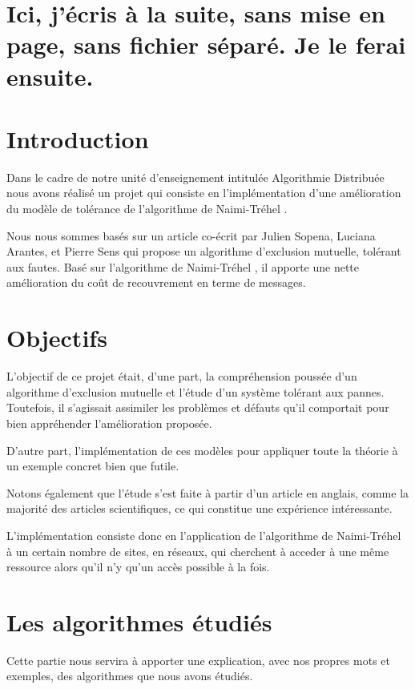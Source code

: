 \documentclass[a4paper,12pt]{article}
\title{\psubject}
\author{Raimana BOUISSOU, Tom GIMENEZ, Léo RIZZON}
\date{}
\newcommand{\nt}{Naimi-Tréhel }
\begin{document}
\maketitle

\section*{Ici, j'écris à la suite, sans mise en page, sans fichier séparé. Je le ferai ensuite.}

\section{Introduction}

Dans le cadre de notre unité d'enseignement intitulée Algorithmie Distribuée nous avons réalisé un projet qui consiste en l'implémentation d'une amélioration du modèle de tolérance de l'algorithme de \nt.

Nous nous sommes basés sur un article co-écrit par Julien Sopena, Luciana Arantes, et Pierre Sens qui propose un algorithme d'exclusion mutuelle, tolérant aux fautes. Basé sur l'algorithme de \nt, il apporte une nette amélioration du coût de recouvrement en terme de messages.



\section{Objectifs}

L'objectif de ce projet était, d'une part, la compréhension poussée d'un algorithme d'exclusion mutuelle et l'étude d'un système tolérant aux pannes.  Toutefois, il s'agissait assimiler les problèmes et défauts qu'il comportait pour bien appréhender l'amélioration proposée.

D'autre part, l'implémentation de ces modèles pour appliquer toute la théorie à un exemple concret bien que futile.

Notons également que l'étude s'est faite à partir d'un article en anglais, comme la majorité des articles scientifiques, ce qui constitue une expérience intéressante.

L'implémentation consiste donc en l'application de l'algorithme de \nt à un certain nombre de sites, en réseaux, qui cherchent à acceder à une même ressource alors qu'il n'y qu'un accès possible à la fois.

\section{Les algorithmes étudiés}
Cette partie nous servira à apporter une explication, avec nos propres mots et exemples, des algorithmes que nous avons étudiés.
\end{document}
